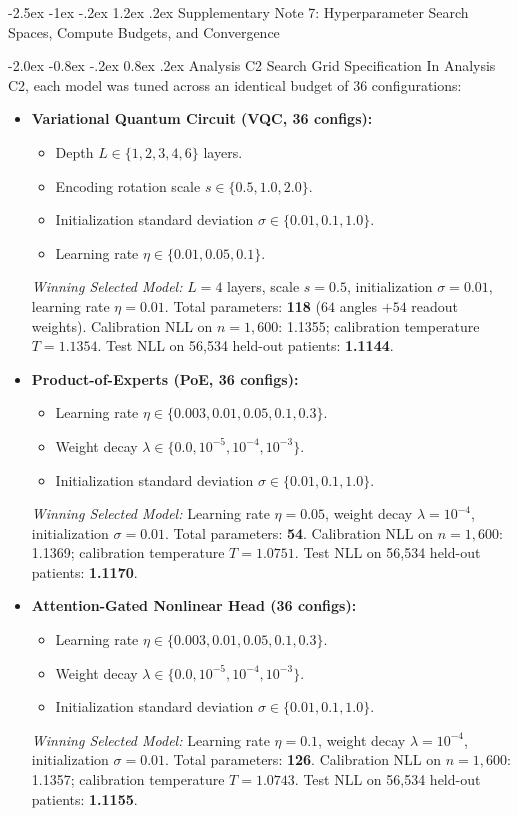 \documentclass[10pt,a4paper]{article}
\makeatletter
\renewcommand{\section}{\@startsection{section}{1}{\z@}%
  {-2.5ex \@plus -1ex \@minus -.2ex}%
  {1.2ex \@plus.2ex}%
  {\normalfont\Large\sffamily\bfseries\color{naturedark}}}
\renewcommand{\subsection}{\@startsection{subsection}{2}{\z@}%
  {-2.0ex \@plus -0.8ex \@minus -.2ex}%
  {0.8ex \@plus.2ex}%
  {\normalfont\large\sffamily\bfseries\color{naturedark}}}
\makeatother
\begin{document}
\section{Supplementary Note 7: Hyperparameter Search Spaces, Compute Budgets, and Convergence}

\subsection{Analysis C2 Search Grid Specification}
In Analysis C2, each model was tuned across an identical budget of 36 configurations:
\begin{itemize}
  \item \textbf{Variational Quantum Circuit (VQC, 36 configs):}
    \begin{itemize}
      \item Depth $L \in \{1, 2, 3, 4, 6\}$ layers.
      \item Encoding rotation scale $s \in \{0.5, 1.0, 2.0\}$.
      \item Initialization standard deviation $\sigma \in \{0.01, 0.1, 1.0\}$.
      \item Learning rate $\eta \in \{0.01, 0.05, 0.1\}$.
    \end{itemize}
    \textit{Winning Selected Model:} $L=4$ layers, scale $s=0.5$, initialization $\sigma=0.01$, learning rate $\eta=0.01$. Total parameters: \textbf{118} ($64$ angles $+ 54$ readout weights). Calibration NLL on $n=1,600$: 1.1355; calibration temperature $T = 1.1354$. Test NLL on 56,534 held-out patients: \textbf{1.1144}.
  \item \textbf{Product-of-Experts (PoE, 36 configs):}
    \begin{itemize}
      \item Learning rate $\eta \in \{0.003, 0.01, 0.05, 0.1, 0.3\}$.
      \item Weight decay $\lambda \in \{0.0, 10^{-5}, 10^{-4}, 10^{-3}\}$.
      \item Initialization standard deviation $\sigma \in \{0.01, 0.1, 1.0\}$.
    \end{itemize}
    \textit{Winning Selected Model:} Learning rate $\eta=0.05$, weight decay $\lambda=10^{-4}$, initialization $\sigma=0.01$. Total parameters: \textbf{54}. Calibration NLL on $n=1,600$: 1.1369; calibration temperature $T = 1.0751$. Test NLL on 56,534 held-out patients: \textbf{1.1170}.
  \item \textbf{Attention-Gated Nonlinear Head (36 configs):}
    \begin{itemize}
      \item Learning rate $\eta \in \{0.003, 0.01, 0.05, 0.1, 0.3\}$.
      \item Weight decay $\lambda \in \{0.0, 10^{-5}, 10^{-4}, 10^{-3}\}$.
      \item Initialization standard deviation $\sigma \in \{0.01, 0.1, 1.0\}$.
    \end{itemize}
    \textit{Winning Selected Model:} Learning rate $\eta=0.1$, weight decay $\lambda=10^{-4}$, initialization $\sigma=0.01$. Total parameters: \textbf{126}. Calibration NLL on $n=1,600$: 1.1357; calibration temperature $T = 1.0743$. Test NLL on 56,534 held-out patients: \textbf{1.1155}.
\end{itemize}
\end{document}
